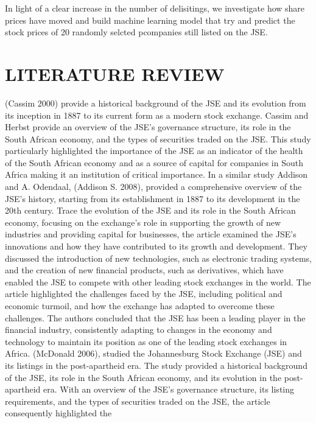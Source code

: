 \documentclass[
]{article}
\begin{document}
In light of a clear increase in the number of delisitings, we
investigate how share prices have moved and build machine learning model
that try and predict the stock prices of 20 randomly selcted pcompanies
still listed on the JSE.

\hypertarget{literature-review}{%
\section{LITERATURE REVIEW}\label{literature-review}}

(Cassim 2000) provide a historical background of the JSE and its
evolution from its inception in 1887 to its current form as a modern
stock exchange. Cassim and Herbst provide an overview of the JSE's
governance structure, its role in the South African economy, and the
types of securities traded on the JSE. This study particularly
highlighted the importance of the JSE as an indicator of the health of
the South African economy and as a source of capital for companies in
South Africa making it an institution of critical importance. In a
similar study Addison and A. Odendaal, (Addison S. 2008), provided a
comprehensive overview of the JSE's history, starting from its
establishment in 1887 to its development in the 20th century. Trace the
evolution of the JSE and its role in the South African economy, focusing
on the exchange's role in supporting the growth of new industries and
providing capital for businesses, the article examined the JSE's
innovations and how they have contributed to its growth and development.
They discussed the introduction of new technologies, such as electronic
trading systems, and the creation of new financial products, such as
derivatives, which have enabled the JSE to compete with other leading
stock exchanges in the world. The article highlighted the challenges
faced by the JSE, including political and economic turmoil, and how the
exchange has adapted to overcome these challenges. The authors concluded
that the JSE has been a leading player in the financial industry,
consistently adapting to changes in the economy and technology to
maintain its position as one of the leading stock exchanges in Africa.
(McDonald 2006), studied the Johannesburg Stock Exchange (JSE) and its
listings in the post-apartheid era. The study provided a historical
background of the JSE, its role in the South African economy, and its
evolution in the post-apartheid era. With an overview of the JSE's
governance structure, its listing requirements, and the types of
securities traded on the JSE, the article consequently highlighted the
\end{document}
